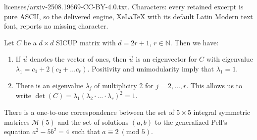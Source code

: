 \documentclass[10pt,a4paper]{amsart}
\newcommand{\N}{\mathbb{N}}
\newcommand{\Pell}{\mathcal{P}}
\begin{document}
licenses/arxiv-2508.19669-CC-BY-4.0.txt. Characters: every retained excerpt is pure ASCII, so the delivered engine, XeLaTeX with its default Latin Modern text font, reports no missing character.
\begin{remark}\label{prop:circulant} Let $C$ be a $d\times d$ SICUP matrix with $d=2r+1$, $r\in\N$. Then we have:
\begin{enumerate}
\item If $\vec{u}$ denotes the vector of ones, then $\vec{u}$ is an eigenvector for $C$ with eigenvalue $\lambda_1=c_1+2(c_2+\ldots c_r)$. Positivity and unimodularity imply that $\lambda_1=1$.
\item There is an eigenvalue $\lambda_j$ of multiplicity 2 for $j=2,\ldots,r$. This allows us to write $\det(C)=\lambda_1(\lambda_2\cdot\ldots\cdot\lambda_r)^2=1$.
\end{enumerate}
\end{remark}

\begin{proposition}\label{prop: SICUP and Pell's eq}
There is a one-to-one correspondence between the set of $5\times 5$ integral symmetric matrices $\mathcal{M}(5)$ and the set of solutions $(a,b)$ to the generalized Pell's equation $a^{2}-5b^{2}=4$ such that $a\equiv 2~(\text{mod }5)$.
\end{proposition} 
\end{document}
